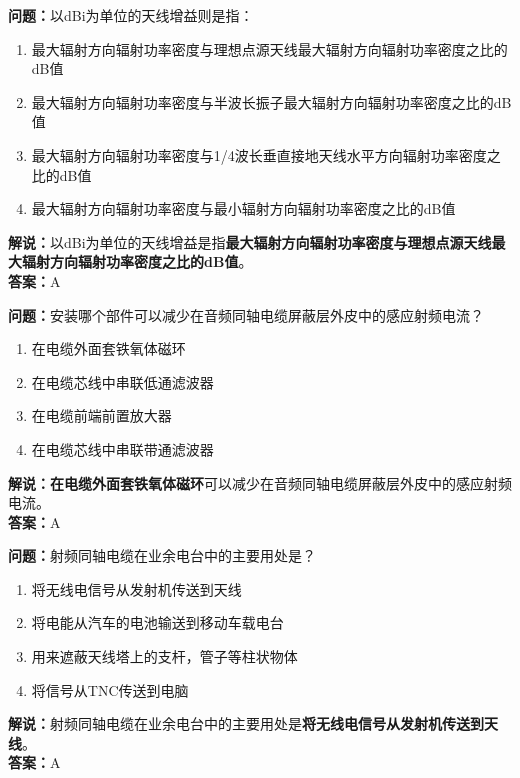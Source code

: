 \textbf{问题：}以dBi为单位的天线增益则是指：
\begin{enumerate}[label=\Alph*), leftmargin=1cm]
	\item 最大辐射方向辐射功率密度与理想点源天线最大辐射方向辐射功率密度之比的dB值
	\item 最大辐射方向辐射功率密度与半波长振子最大辐射方向辐射功率密度之比的dB值
	\item 最大辐射方向辐射功率密度与1/4波长垂直接地天线水平方向辐射功率密度之比的dB值
	\item 最大辐射方向辐射功率密度与最小辐射方向辐射功率密度之比的dB值
\end{enumerate}

\textbf{解说：}以dBi为单位的天线增益是指\textbf{最大辐射方向辐射功率密度与理想点源天线最大辐射方向辐射功率密度之比的dB值}。\\\textbf{答案：}A



\textbf{问题：}安装哪个部件可以减少在音频同轴电缆屏蔽层外皮中的感应射频电流？

\begin{enumerate}[label=\Alph*), leftmargin=1cm]
	\item 在电缆外面套铁氧体磁环
	\item 在电缆芯线中串联低通滤波器
	\item 在电缆前端前置放大器
	\item 在电缆芯线中串联带通滤波器
\end{enumerate}

\textbf{解说：}\textbf{在电缆外面套铁氧体磁环}可以减少在音频同轴电缆屏蔽层外皮中的感应射频电流。\\\textbf{答案：}A



\textbf{问题：}射频同轴电缆在业余电台中的主要用处是？

\begin{enumerate}[label=\Alph*), leftmargin=1cm]
	\item 将无线电信号从发射机传送到天线
	\item 将电能从汽车的电池输送到移动车载电台
	\item 用来遮蔽天线塔上的支杆，管子等柱状物体
	\item 将信号从TNC传送到电脑
\end{enumerate}

\textbf{解说：}射频同轴电缆在业余电台中的主要用处是\textbf{将无线电信号从发射机传送到天线}。\\\textbf{答案：}A



